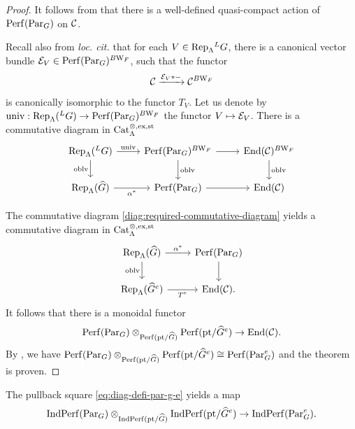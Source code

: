\begin{proof}
    It follows from \cite[Theorem X.0.1]{Geometrization} that there is a well-defined quasi-compact action of $\mathrm{Perf}(\mathrm{Par}_G)$ on $\mathcal{C}$. 

    Recall also from \emph{loc. cit.} that for each $V \in \mathrm{Rep}_{\Lambda}{^L}G$, there is a canonical vector bundle $\mathcal{E}_V \in \mathrm{Perf}(\mathrm{Par}_G)^{B\mathrm{W}_F}$, such that the functor 
    $$\mathcal{C} \xrightarrow{\mathcal{E}_V * - } \mathcal{C}^{B\mathrm{W}_F}$$
    is canonically isomorphic to the functor $T_V$. Let us denote by $\mathrm{univ} : \mathrm{Rep}_{\Lambda}({^L}G) \to \mathrm{Perf}(\mathrm{Par}_G)^{B\mathrm{W}_F}$ the functor $V \mapsto \mathcal{E}_V$. There is a commutative diagram in $\mathrm{Cat}_{\Lambda}^{\otimes, \mathrm{ex}, \mathrm{st}}$
    \[\begin{tikzcd}
	{\Rep_{\Lambda}({^L}G}) & {\Perf(\Par_G)^{B\Weil_F}} & {\End(\Ccal)^{B\Weil_F}} \\
	{\Rep_{\Lambda}(\widehat{G}}) & {\Perf(\Par_G)} & {\End(\Ccal)}
	\arrow["{\mathrm{univ}}", from=1-1, to=1-2]
	\arrow["\oblv"', from=1-1, to=2-1]
	\arrow[from=1-2, to=1-3]
	\arrow["\oblv", from=1-2, to=2-2]
	\arrow["\oblv", from=1-3, to=2-3]
	\arrow["{\alpha^*}"', from=2-1, to=2-2]
	\arrow[from=2-2, to=2-3]
\end{tikzcd}\]

    The commutative diagram \eqref{diag:required-commutative-diagram} yields a commutative diagram in $\mathrm{Cat}_{\Lambda}^{\otimes, \mathrm{ex}, \mathrm{st}}$
    \[\begin{tikzcd}
	{\Rep_{\Lambda}(\widehat{G}}) & {\Perf(\Par_G)} \\
	{\Rep_{\Lambda}(\widehat{G}^e}) & {\End(\Ccal).}
	\arrow["{\alpha^*}", from=1-1, to=1-2]
	\arrow["\oblv"', from=1-1, to=2-1]
	\arrow[from=1-2, to=2-2]
	\arrow["{T^e}"', from=2-1, to=2-2]
\end{tikzcd}\]
    It follows that there is a monoidal functor 
    $$\mathrm{Perf}(\mathrm{Par}_G) \otimes_{\mathrm{Perf}(\mathrm{pt}/\widehat{G})} \mathrm{Perf}(\mathrm{pt}/\widehat{G}^e) \to \mathrm{End}(\mathcal{C}).$$
    By , we have $\mathrm{Perf}(\mathrm{Par}_G) \otimes_{\mathrm{Perf}(\mathrm{pt}/\widehat{G})} \mathrm{Perf}(\mathrm{pt}/\widehat{G}^e) \cong \mathrm{Perf}(\mathrm{Par}_G^e)$ and the theorem is proven.
\end{proof}


The pullback square \eqref{eq:diag-defi-par-g-e} yields a map 
\begin{equation}\label{eq:relative-tensor-product}
   \mathrm{Ind}\mathrm{Perf}(\mathrm{Par}_G) \otimes_{\mathrm{Ind}\mathrm{Perf}(\mathrm{pt}/\widehat{G})} \mathrm{Ind}\mathrm{Perf}(\mathrm{pt}/\widehat{G}^e) \to \mathrm{Ind}\mathrm{Perf}(\mathrm{Par}_G^e).
\end{equation}


